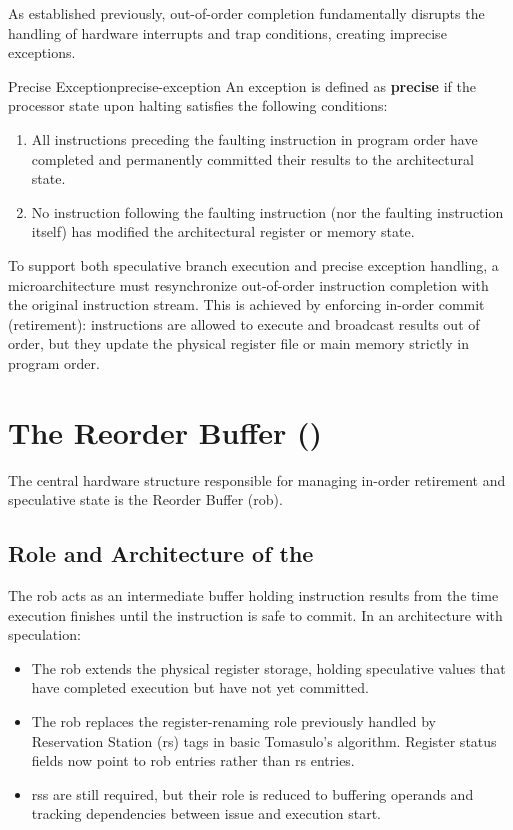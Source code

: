 As established previously, out-of-order completion fundamentally disrupts the handling of hardware interrupts and trap conditions, creating imprecise exceptions.

\begin{definition}{Precise Exception}{precise-exception}
    An exception is defined as \textbf{precise} if the processor state upon halting satisfies the following conditions:
    \begin{enumerate}
        \item All instructions preceding the faulting instruction in program order have completed and permanently committed their results to the architectural state.
        \item No instruction following the faulting instruction (nor the faulting instruction itself) has modified the architectural register or memory state.
    \end{enumerate}
\end{definition}

To support both speculative branch execution and precise exception handling, a microarchitecture must resynchronize out-of-order instruction completion with the original instruction stream. This is achieved by enforcing in-order commit (retirement): instructions are allowed to execute and broadcast results out of order, but they update the physical register file or main memory strictly in program order.

\section{The Reorder Buffer ()}

The central hardware structure responsible for managing in-order retirement and speculative state is the Reorder Buffer (\gls{rob}).

\subsection{Role and Architecture of the }
The \gls{rob} acts as an intermediate buffer holding instruction results from the time execution finishes until the instruction is safe to commit. In an architecture with speculation:
\begin{itemize}
    \item The \gls{rob} extends the physical register storage, holding speculative values that have completed execution but have not yet committed.
    \item The \gls{rob} replaces the register-renaming role previously handled by Reservation Station (\gls{rs}) tags in basic Tomasulo's algorithm. Register status fields now point to \gls{rob} entries rather than \gls{rs} entries.
    \item \glspl{rs} are still required, but their role is reduced to buffering operands and tracking dependencies between issue and execution start.
\end{itemize}

